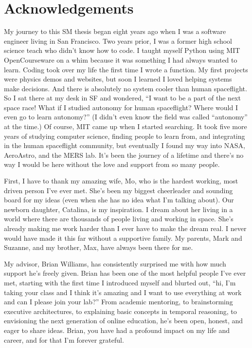 \documentclass[12pt,vi,leftblank,twoside]{mitthesis}
\begin{document}
\cleardoublepage

\section*{Acknowledgements}

My journey to this SM thesis began eight years ago when I was a software engineer living in San
Francisco. Two years prior, I was a former high school science teach who didn't know how to code. I
taught myself Python using MIT OpenCourseware on a whim because it was something I had always wanted
to learn. Coding took over my life the first time I wrote a function. My first projects were physics
demos and websites, but soon I learned I loved helping systems make decisions. And there is
absolutely no system cooler than human spaceflight. So I sat there at my desk in SF and wondered, ``I
want to be a part of the next space race! What if I studied autonomy for human spaceflight? Where
would I even go to learn autonomy?'' (I didn't even know the field was called ``autonomy'' at the
time.) Of course, MIT came up when I started searching. It took five more years of studying computer
science, finding people to learn from, and integrating in the human spaceflight community, but
eventually I found my way into NASA, AeroAstro, and the MERS lab. It's been the journey of a
lifetime and there's no way I would be here without the love and support from so many people.

First, I have to thank my amazing wife, Mo, who is the hardest working, most driven person I've ever
met. She's been my biggest cheerleader and sounding board for my ideas (even when she has no idea
what I'm talking about). Our newborn daughter, Catalina, is my inspiration. I dream about her living
in a world where there are thousands of people living and working in space. She's already making me
work harder than I ever have to make the dream real. I never would have made it this far without a
supportive family. My parents, Mark and Suzanne, and my brother, Max, have always been there for me.

My advisor, Brian Williams, has consistently surprised me with how much support he's freely given.
Brian has been one of the most helpful people I've ever met, starting with the first time I
introduced myself and blurted out, ``hi, I'm taking your class and I think it's amazing and I want to
use everything at work and can I please join your lab?'' From academic mentoring, to brainstorming
executive architectures, to explaining basic concepts in temporal reasoning, to envisioning the next
generation of online education, he's been open, honest, and eager to share ideas. Brian, you have
had a profound impact on my life and career, and for that I'm forever grateful.
\end{document}
